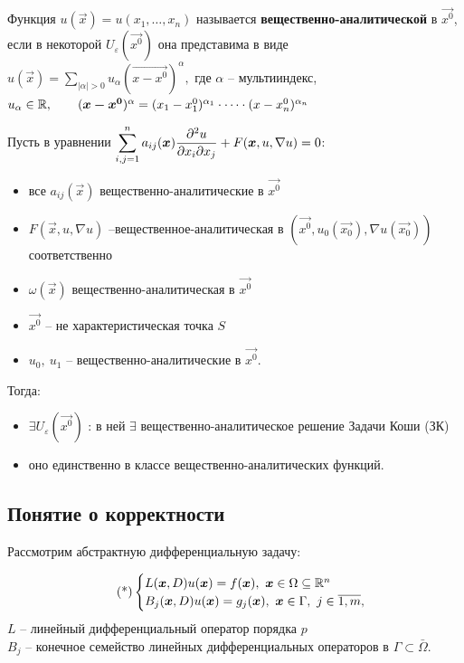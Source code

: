 \documentclass[../main.tex]{subfiles}
\begin{document}
\medskip

Функция $u(\vec{x}) = u(x_1,\dots,x_n)$ называется {\bf вещественно-аналитической} в $\vec{x^0}$, если в некоторой $U_{\varepsilon}(\vec{x^0})$ она представима в виде $u(\vec{x}) = \displaystyle\sum\limits_{|\alpha|>0}u_{\alpha}(\vec{x-x^0})^{\alpha},$ где $\alpha$ -- мультииндекс, $u_{\alpha} \in \mathbb{R}, \qquad (\boldsymbol{x-x^0})^{\alpha} = (x_1-x_1^0)^{\alpha_1}\cdot\dots\cdot(x-x_n^0)^{\alpha_n}$

\begin{theorem}[Ковалевской]
Пусть в уравнении $\displaystyle\sum\limits_{i,j=1}^{n} a_{ij}(\boldsymbol{x})\frac{\partial^2u}{\partial x_i\partial x_j} + F(\boldsymbol{x}, u, \nabla u) = 0$:
\begin{itemize}[noitemsep]
\item все $a_{ij}(\vec{x})$ вещественно-аналитические в $\vec{x^0}$ 
\item $F(\vec{x}, u, \nabla u)$ --вещественное-аналитическая в $(\vec{x^0}, u_0(\vec{x_0}), \nabla u(\vec{x_0}))$ соответственно 
\item $\omega(\vec{x})$ вещественно-аналитическая в $\vec{x^0}$
\item $\vec{x^0}$ -- не характеристическая точка $S$
\item $u_0,\ u_1$ -- вещественно-аналитические в $\vec{x^0}$.
\end{itemize}
Тогда: 
\begin{itemize}[noitemsep]
\item $\exists U_{\varepsilon}(\vec{x^0})$ : в ней $\exists$ вещественно-аналитическое решение Задачи Коши (ЗК)
\item оно единственно в классе вещественно-аналитических функций.
\end{itemize}
\end{theorem}

\subsection*{Понятие о корректности}

Рассмотрим абстрактную дифференциальную задачу:

\begin{equation}
\label{eq::2::diff}
\tag{*}
\begin{cases} L(\vec{x}, D)u(\vec{x}) = f(\vec{x}),\ \vec{x} \in \Omega \subseteq \R^n  \\
B_j(\vec{x},D) u(\vec{x}) = g_j(\vec{x}),\ \vec{x}\in \Gamma,\ j\in\overline{1,m},
\end{cases}
\end{equation}
$L$ -- линейный дифференциальный оператор порядка $p$\\
$B_j$ -- конечное семейство линейных дифференциальных операторов в $\Gamma \subset \bar{\Omega}$.
\end{document}
